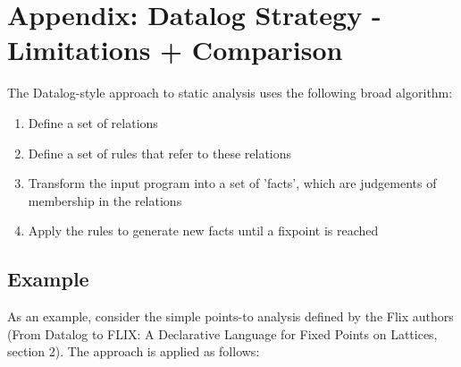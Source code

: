 \documentclass[acmlarge,anonymous]{acmart}\settopmatter{printfolios=true}
\begin{document}
%


\appendix
\section{Appendix: Datalog Strategy - Limitations + Comparison}

The Datalog-style approach to static analysis uses the following broad algorithm:

\begin{enumerate}
    \item Define a set of relations
    \item Define a set of rules that refer to these relations
    \item Transform the input program into a set of 'facts', which are judgements of membership in the relations
    \item Apply the rules to generate new facts until a fixpoint is reached
\end{enumerate}

\subsection{Example}

As an example, consider the simple points-to analysis defined by the Flix authors (From Datalog to FLIX: A Declarative Language for Fixed Points on Lattices, section 2). The approach is applied as follows:
\end{document}
